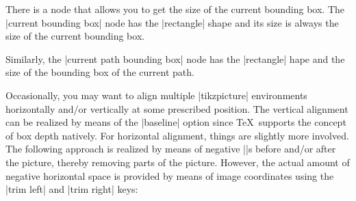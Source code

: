 There is a node that allows you to get the size of the current
bounding box. The |current bounding box| node has the |rectangle|
shape and its size is always the size of the current 
bounding box.

Similarly, the |current path bounding box| node has the |rectangle|
hape and the size of the bounding box of the current path.


\begin{codeexample}[]
\end{codeexample}


Occasionally, you may want to align multiple |tikzpicture| environments horizontally and/or vertically at some prescribed position. The vertical alignment can be realized by means of the |baseline| option since \TeX\ supports the concept of box depth natively. For horizontal alignment, things are slightly more involved. The following approach is realized by means of negative |\hspace|s before and/or after the picture, thereby removing parts of the picture. However, the actual amount of negative horizontal space is provided by means of image coordinates using the |trim left| and |trim right| keys:

